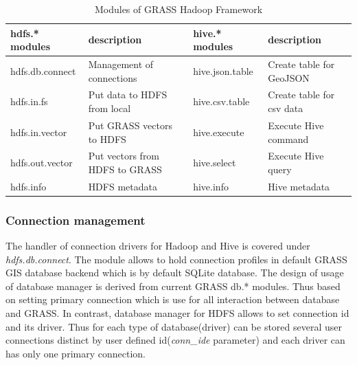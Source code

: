 \documentclass[a4paper,12pt,oneside]{report}
\begin{document}
\begin{table}[!htbp]
\centering
\begin{scriptsize}
\begin{tabular}{@{}|l|l||l|l|@{}}
\toprule
hdfs.* modules  & description                    & hive.* modules  & description               \\ \midrule \midrule
hdfs.db.connect & Management of connections      & hive.json.table & Create table for GeoJSON  \\ \midrule
hdfs.in.fs      & Put data to HDFS from local       & hive.csv.table  & Create table for csv data \\ \midrule
hdfs.in.vector  & Put GRASS vectors to HDFS      & hive.execute    & Execute Hive command      \\ \midrule
hdfs.out.vector & Put vectors from HDFS to GRASS & hive.select     & Execute Hive query        \\ \midrule
hdfs.info       & HDFS metadata                  & hive.info       & Hive metadata             \\ \bottomrule
\end{tabular}%
\end{scriptsize}
\caption{Modules of GRASS Hadoop Framework}
\label{tbl:modules}
\end{table}



\subsubsection{Connection management} 
The handler of connection drivers for Hadoop and Hive is covered under \textit{hdfs.db.connect}. The module allows to hold connection profiles in default GRASS GIS database backend which is  by default SQLite database. The design of usage of database manager is derived from current GRASS db.* modules. Thus based on setting primary connection which is use for all interaction between database and GRASS. In contrast, database manager for HDFS allows to set connection id and its driver. Thus for each type of database(driver) can be stored several user connections distinct by user defined id(\textit{conn\_ide} parameter) and each driver can has only one primary connection.
\end{document}

